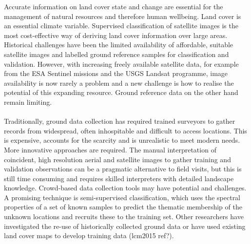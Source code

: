Accurate information on land cover state and change are essential for the management of natural resources and therefore human wellbeing\cite{alcock2015accounts,burkhard2009landscapes,koschke2012multi}. Land cover is an essential climate variable\cite{bojinski2014concept,vargo2013importance}. Supervised classification of satellite images is the most cost-effective way of deriving land cover information over large areas.  Historical challenges have been the limited availability of affordable, suitable satellite images and labelled ground reference samples for classification and validation.  However, with increasing freely available satellite data, for example from the ESA Sentinel missions and the USGS Landsat programme, image availability is now rarely a problem and a new challenge is how to realise the potential of this expanding resource.  Ground reference data on the other hand remain limiting.  
\paragraph{}Traditionally, ground data collection has required trained surveyors to gather records from widespread, often inhospitable and difficult to access locations.  This is expensive, accounts for the scarcity and is unrealistic to meet modern needs. More innovative approaches are required.  The manual interpretation of coincident, high resolution aerial and satellite images to gather training and validation observations can be a pragmatic alternative to field visits, but this is still time consuming and requires skilled interpreters with detailed landscape knowledge.  Crowd-based data collection tools may have potential\cite{laso2016crowdsourcing,comber2013using,fritz2012geo, fritz2017global} and challenges\cite{comber2016crowdsourcing}.  A promising technique is semi-supervised classification\cite{maulik2011self,liu2013self}, which uses the spectral properties of a set of known samples to predict the thematic membership of the unknown locations and recruits these to the training set.  Other researchers have investigated the re-use of historically collected ground data \cite{inglada2017operational,tardy2017fusion} or have used existing land cover maps to develop training data \cite{kim2017self} (lcm2015 ref?). 
